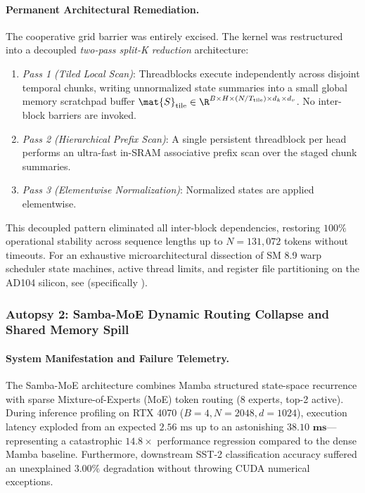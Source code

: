 \paragraph{Permanent Architectural Remediation.}
The cooperative grid barrier was entirely excised. The kernel was restructured into a decoupled \emph{two-pass split-K reduction} architecture:
\begin{enumerate}
    \item \emph{Pass 1 (Tiled Local Scan)}: Threadblocks execute independently across disjoint temporal chunks, writing unnormalized state summaries into a small global memory scratchpad buffer $\mat{S}_{\text{tile}} \in \R^{B \times H \times (N/T_{\text{tile}}) \times d_k \times d_v}$. No inter-block barriers are invoked.
    \item \emph{Pass 2 (Hierarchical Prefix Scan)}: A single persistent threadblock per head performs an ultra-fast in-SRAM associative prefix scan over the staged chunk summaries.
    \item \emph{Pass 3 (Elementwise Normalization)}: Normalized states are applied elementwise.
\end{enumerate}
This decoupled pattern eliminated all inter-block dependencies, restoring $100\%$ operational stability across sequence lengths up to $N = 131{,}072$ tokens without timeouts. For an exhaustive microarchitectural dissection of SM 8.9 warp scheduler state machines, active thread limits, and register file partitioning on the AD104 silicon, see  (specifically ).

\subsubsection{Autopsy 2: Samba-MoE Dynamic Routing Collapse and Shared Memory Spill}
\label{sec:autopsy_samba_moe}

\paragraph{System Manifestation and Failure Telemetry.}
The Samba-MoE architecture combines Mamba structured state-space recurrence with sparse Mixture-of-Experts (MoE) token routing (8 experts, top-2 active). During inference profiling on RTX 4070 ($B=4, N=2048, d=1024$), execution latency exploded from an expected $2.56\text{ ms}$ up to an astonishing $\mathbf{38.10\text{ ms}}$---representing a catastrophic $\mathbf{14.8\times}$ performance regression compared to the dense Mamba baseline. Furthermore, downstream SST-2 classification accuracy suffered an unexplained $3.00\%$ degradation without throwing CUDA numerical exceptions.

